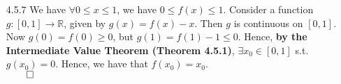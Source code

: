 \documentclass[11pt]{article}
\newcommand{\reals}{\mathbb{R}}
\begin{document}
\begin{itemize}
    \item[4.5.7]
        We have $\forall 0 \leq x \leq 1$, we have $0 \leq f(x) \leq 1$.
        Consider a function $g : [0, 1] \to \reals$, given by $g(x) = f(x) -
        x$.  Then $g$ is continuous on $[0, 1]$. Now $g(0) = f(0) \geq 0$, but
        $g(1) = f(1) - 1 \leq 0$. Hence, \textbf{by the Intermediate Value
        Theorem (Theorem 4.5.1)}, $\exists x_0 \in [0, 1]$ s.t.  $g(x_0) = 0$.
        Hence, we have that $f(x_0) = x_0$.\\
        $\qed$
\end{itemize}

\end{document}
